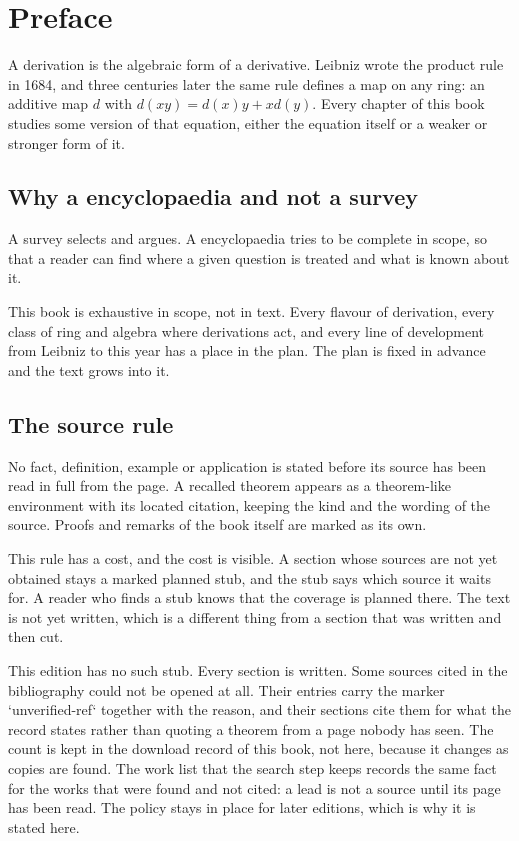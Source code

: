 \chapter*{Preface}
\label{page:preface}

A derivation is the algebraic form of a derivative.
Leibniz wrote the product rule in 1684, and three centuries later the same rule
defines a map on any ring: an additive map $d$ with $d(xy)=d(x)y+xd(y)$.
Every chapter of this book studies some version of that equation, either the
equation itself or a weaker or stronger form of it.

\section*{Why a encyclopaedia and not a survey}

A survey selects and argues. A encyclopaedia tries to be complete in scope, so that a
reader can find where a given question is treated and what is known about it.

This book is exhaustive in scope, not in text.
Every flavour of derivation, every class of ring and algebra where derivations
act, and every line of development from Leibniz to this year has a place in the
plan.
The plan is fixed in advance and the text grows into it.

\section*{The source rule}

No fact, definition, example or application is stated before its source has been
read in full from the page.
A recalled theorem appears as a theorem-like environment with its located
citation, keeping the kind and the wording of the source.
Proofs and remarks of the book itself are marked as its own.

This rule has a cost, and the cost is visible.
A section whose sources are not yet obtained stays a marked planned
stub, and the stub says which source it waits for.
A reader who finds a stub knows that the coverage is planned there.
The text is not yet written, which is a different thing from a section that was
written and then cut.

This edition has no such stub.
Every section is written.
Some sources cited in the bibliography could not be opened at all.
Their entries carry the marker `unverified-ref` together with the reason, and
their sections cite them for what the record states rather than quoting a
theorem from a page nobody has seen.
The count is kept in the download record of this book, not here, because it
changes as copies are found.
The work list that the search step keeps records the same fact for the works
that were found and not cited: a lead is not a source until its page has been
read.
The policy stays in place for later editions, which is why it is stated here.

